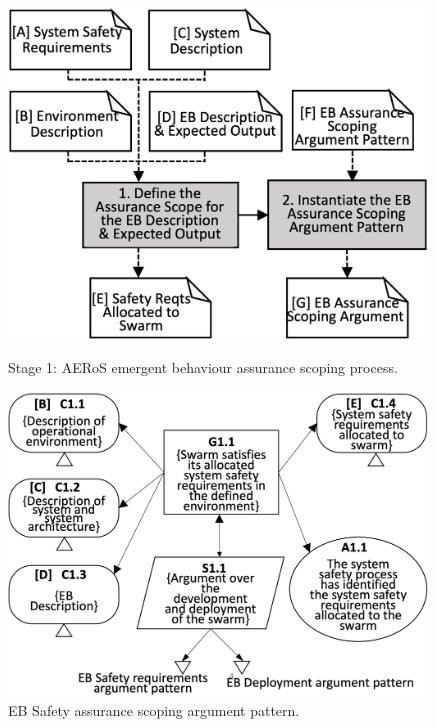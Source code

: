 \documentclass[runningheads]{llncs}
\begin{document}
\vspace{-4ex}
\begin{figure}
	\centering
	\begin{minipage}{.5\textwidth}
		\centering
		\includegraphics[width=0.99\textwidth]{figures/AMLAS-STAGE-1-V4.png}
		\vspace{-2ex}
		\caption{Stage 1: AERoS emergent behaviour assurance scoping process.}
		\label{amlas-a-stage1}
	\end{minipage}%
	\begin{minipage}{.5\textwidth}
	\centering
	\includegraphics[width=0.99\textwidth]{figures/stage1-argumentpattern-v3.png}
	\vspace{-2ex}
	\caption{EB Safety assurance scoping argument pattern.}
	\label{stage1-ap}
	\end{minipage}
\vspace{-4ex}
\end{figure}
\end{document}
